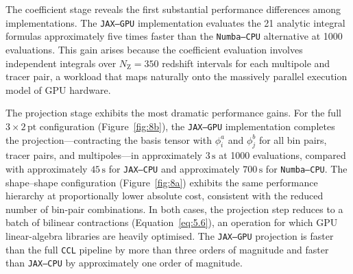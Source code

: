 The coefficient stage reveals the first substantial performance differences among implementations. The \texttt{JAX--GPU} implementation evaluates the 21 analytic integral formulas approximately five times faster than the \texttt{Numba--CPU} alternative at 1000 evaluations. This gain arises because the coefficient evaluation involves independent integrals over \(N_\mathrm{Z} = 350\) redshift intervals for each multipole and tracer pair, a workload that maps naturally onto the massively parallel execution model of GPU hardware.

The projection stage exhibits the most dramatic performance gains. For the full \(3\times2\,\mathrm{pt}\) configuration (Figure~\ref{fig:8b}), the \texttt{JAX--GPU} implementation completes the projection---contracting the basis tensor with \(\phi^{a}_{i}\) and \(\phi^{b}_{j}\) for all bin pairs, tracer pairs, and multipoles---in approximately \(3\,\mathrm{s}\) at 1000 evaluations, compared with approximately \(45\,\mathrm{s}\) for \texttt{JAX--CPU} and approximately \(700\,\mathrm{s}\) for \texttt{Numba--CPU}. The shape--shape configuration (Figure~\ref{fig:8a}) exhibits the same performance hierarchy at proportionally lower absolute cost, consistent with the reduced number of bin-pair combinations. In both cases, the projection step reduces to a batch of bilinear contractions (Equation~\ref{eq:5.6}), an operation for which GPU linear-algebra libraries are heavily optimised. The \texttt{JAX--GPU} projection is faster than the full \texttt{CCL} pipeline by more than three orders of magnitude and faster than \texttt{JAX--CPU} by approximately one order of magnitude.

